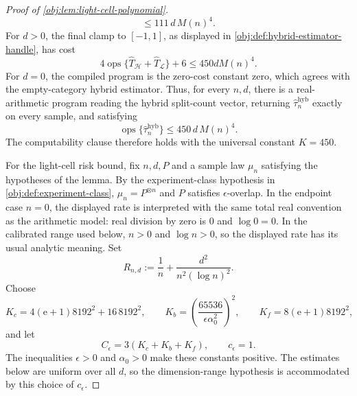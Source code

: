 \begin{proof}[Proof of \cref{obj:lem:light-cell-polynomial}]
\[\le 111\,d\,M(n)^4 .
\]
For \(d>0\), the final clamp to \([-1,1]\), as displayed in \cref{obj:def:hybrid-estimator-handle}, has cost
\[
4\operatorname{ops}\{\widehat T_{\mathcal H}+\widehat T_{\mathcal L}\}+6
\le 450dM(n)^4 .
\]
For \(d=0\), the compiled program is the zero-cost constant zero, which agrees with the empty-category hybrid estimator.  Thus, for every \(n,d\), there is a real-arithmetic program reading the hybrid split-count vector, returning \(\widehat\tau_n^{\mathrm{hyb}}\) exactly on every sample, and satisfying
\[
\operatorname{ops}\{\widehat\tau_n^{\mathrm{hyb}}\}
\le 450\,d\,M(n)^4 .
\] %
The computability clause therefore holds with the universal constant \(K=450\).

For the light-cell risk bound, fix \(n,d,P\) and a sample law \(\mu_n\) satisfying the hypotheses of the lemma.  By the experiment-class hypothesis in \cref{obj:def:experiment-class}, \(\mu_n=P^{\otimes n}\) and \(P\) satisfies \(\epsilon\)-overlap.  In the endpoint case \(n=0\), the displayed rate is interpreted with the same total real convention as the arithmetic model: real division by zero is \(0\) and \(\log 0=0\).  In the calibrated range used below, \(n>0\) and \(\log n>0\), so the displayed rate has its usual analytic meaning.  Set
\[
R_{n,d}:=\frac1n+\frac{d^2}{n^2(\log n)^2}.
\]
Choose
\[
K_c=4(\mathrm e+1)8192^2+16\,8192^2,
\qquad K_b=\left(\frac{65536}{\epsilon\alpha_0^2}\right)^2,
\qquad K_f=8(\mathrm e+1)8192^2,
\]
and let
\[
C_\epsilon=3(K_c+K_b+K_f),\qquad c_\epsilon=1 .
\] %
The inequalities \(\epsilon>0\) and \(\alpha_0>0\) make these constants positive.  The estimates below are uniform over all \(d\), so the dimension-range hypothesis is accommodated by this choice of \(c_\epsilon\).


\end{proof}
